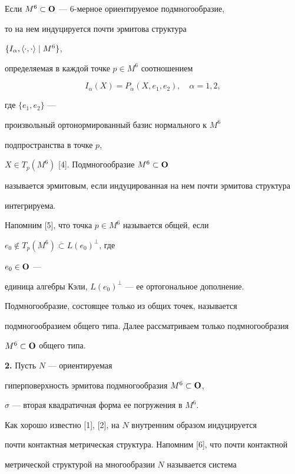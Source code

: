 Если $M^6 \subset \bold O$ --- 6-мерное ориентируемое подмногообразие, 


то на нем индуцируется почти эрмитова структура 


$\{ I_\alpha, \langle \cdot,\cdot\rangle  \mid M^6 \}$, 


определяемая в каждой точке $p \in M^6$ соотношением


$$


I_\alpha (X)=P_\alpha (X,e_1,e_2), \quad \alpha=1, 2,


$$


где $\{e_1, e_2 \}$ ---


произвольный ортонормированный базис нормального к $M^6$


подпространства в точке $p$,


$X \in T_p(M^6)$ [4]. Подмногообразие $M^6 \subset \bold O$ 


называется эрмитовым, если индуцированная на нем почти эрмитова структура 


интегрируема.





Напомним [5], что точка $p \in M^6$ называется общей, если


$e_0 \notin T_p (M^6) \overline{\subset} L(e_0)^\perp$, где


$e_0 \in \bold O$ --- 


единица алгебры Кэли, $L(e_0)^\perp$ --- ее ортогональное дополнение. 


Подмногообразие, состоящее только из общих точек, называется 


подмногообразием общего типа. Далее рассматриваем только подмногообразия 


$M^6 \subset \bold O$ общего типа.


\medskip





{\bf 2.} Пусть $N$ --- ориентируемая 


гиперповерхность эрмитова подмногообразия $M^6 \subset \bold O$, 


$\sigma$ --- вторая квадратичная форма ее погружения в $M^6$. 


Как хорошо известно [1], [2], на $N$ внутренним образом индуцируется 


почти контактная метрическая структура. Напомним [6], что почти контактной


метрической структурой на многообразии $N$ называется система 


